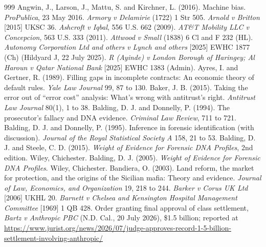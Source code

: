 \begin{thebibliography}{999}
 Angwin, J., Larson, J., Mattu, S. and Kirchner, L. (2016). Machine bias. \emph{ProPublica}, 23 May 2016.
 \emph{Armory v Delamirie} (1722) 1 Str 505.
 \emph{Arnold v Britton} [2015] UKSC 36.
 \emph{Ashcroft v Iqbal}, 556 U.S. 662 (2009).
 \emph{AT\&T Mobility LLC v Concepcion}, 563 U.S. 333 (2011).
 \emph{Attwood v Small} (1838) 6 Cl and F 232 (HL).
 \emph{Autonomy Corporation Ltd and others v Lynch and others} [2025] EWHC 1877 (Ch) (Hildyard J, 22 July 2025).
 \emph{R (Ayinde) v London Borough of Haringey; Al Haroun v Qatar National Bank} [2025] EWHC 1383 (Admin).
 Ayres, I. and Gertner, R. (1989). Filling gaps in incomplete contracts: An economic theory of default rules. \emph{Yale Law Journal} 99, 87 to 130.
 Baker, J. B. (2015). Taking the error out of ``error cost'' analysis: What's wrong with antitrust's right. \emph{Antitrust Law Journal} 80(1), 1 to 38.
 Balding, D. J. and Donnelly, P. (1994). The prosecutor's fallacy and DNA evidence. \emph{Criminal Law Review}, 711 to 721.
 Balding, D. J. and Donnelly, P. (1995). Inference in forensic identification (with discussion). \emph{Journal of the Royal Statistical Society A} 158, 21 to 53.
 Balding, D. J. and Steele, C. D. (2015). \emph{Weight of Evidence for Forensic DNA Profiles}, 2nd edition. Wiley, Chichester.
 Balding, D. J. (2005). \emph{Weight of Evidence for Forensic DNA Profiles}. Wiley, Chichester.
 Bandiera, O. (2003). Land reform, the market for protection, and the origins of the Sicilian mafia: Theory and evidence. \emph{Journal of Law, Economics, and Organization} 19, 218 to 244.
 \emph{Barker v Corus UK Ltd} [2006] UKHL 20.
 \emph{Barnett v Chelsea and Kensington Hospital Management Committee} [1969] 1 QB 428.
 Order granting final approval of class settlement, \emph{Bartz v Anthropic PBC} (N.D. Cal., 20 July 2026), \$1.5 billion; reported at \url{https://www.jurist.org/news/2026/07/judge-approves-record-1-5-billion-settlement-involving-anthropic/}

\end{thebibliography}
